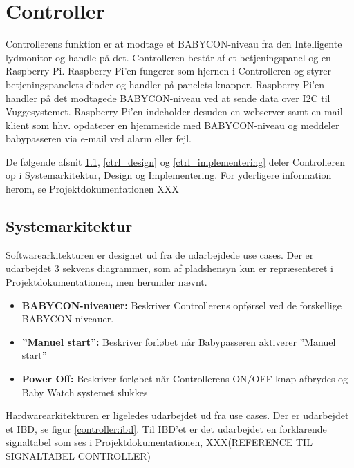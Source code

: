 \chapter{Controller}

Controllerens funktion er at modtage et BABYCON-niveau fra den Intelligente lydmonitor og handle på det. Controlleren består af et betjeningspanel og en Raspberry Pi. Raspberry Pi'en fungerer som hjernen i Controlleren og styrer betjeningspanelets dioder og handler på panelets knapper. Raspberry Pi'en handler på det modtagede BABYCON-niveau ved at sende data over I2C til Vuggesystemet. Raspberry Pi'en indeholder desuden en webserver samt en mail klient som hhv. opdaterer en hjemmeside med BABYCON-niveau og meddeler babypasseren via e-mail ved alarm eller fejl.

De følgende afsnit \ref{ctrl_sysark},   \ref{ctrl_design} og \ref{ctrl_implementering} deler Controlleren op i Systemarkitektur, Design og Implementering. For yderligere information herom, se Projektdokumentationen XXX

\section{Systemarkitektur}
\label{ctrl_sysark}

Softwarearkitekturen er designet ud fra de udarbejdede use cases. Der er udarbejdet 3 sekvens diagrammer, som af pladshensyn kun er repræsenteret i Projektdokumentationen, men herunder nævnt. 

\begin{itemize}
\item \textbf{BABYCON-niveauer:} Beskriver Controllerens opførsel ved de forskellige BABYCON-niveauer.
\item \textbf{''Manuel start'':} Beskriver forløbet når Babypasseren aktiverer ''Manuel start''
\item \textbf{Power Off:} Beskriver forløbet når Controllerens ON/OFF-knap afbrydes og Baby Watch systemet slukkes 
\end{itemize}


Hardwarearkitekturen er ligeledes udarbejdet ud fra use cases. Der er udarbejdet et IBD, se figur \ref{controller:ibd}. Til IBD'et er det udarbejdet en forklarende signaltabel som ses i Projektdokumentationen, XXX(REFERENCE TIL SIGNALTABEL CONTROLLER)




